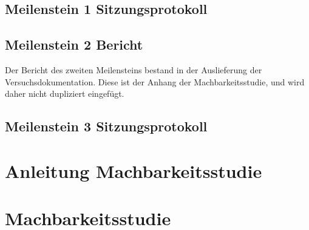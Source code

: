 \section{Meilenstein 1 Sitzungsprotokoll}


\section{Meilenstein 2 Bericht}
Der Bericht des zweiten Meilensteins bestand in der Auslieferung der Versuchsdokumentation. Diese ist der Anhang der Machbarkeitsstudie, und wird daher nicht dupliziert eingefügt.

\section{Meilenstein 3 Sitzungsprotokoll}
\label{app:sec:protokollMeilenstein3}


\newpage
\chapter{Anleitung Machbarkeitsstudie}
\label{app:ch:AnleitungMachbarkeitsstudie}


\newpage
\chapter{Machbarkeitsstudie}
\label{app:ch:Machbarkeitsstudie}

